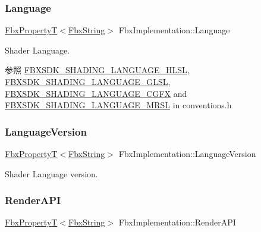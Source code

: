 \subsubsection{\texorpdfstring{Language}{Language}}
{\footnotesize\ttfamily \hyperlink{class_fbx_property_t}{Fbx\+PropertyT}$<$\hyperlink{class_fbx_string}{Fbx\+String}$>$ Fbx\+Implementation\+::\+Language}

Shader Language. \begin{DoxySeeAlso}{参照}
\hyperlink{fbxshadingconventions_8h_ac10b54a713e5562fe6572d1a2594288f}{F\+B\+X\+S\+D\+K\+\_\+\+S\+H\+A\+D\+I\+N\+G\+\_\+\+L\+A\+N\+G\+U\+A\+G\+E\+\_\+\+H\+L\+SL}, \hyperlink{fbxshadingconventions_8h_a52222f21db3187bf9ed4986f053aa44f}{F\+B\+X\+S\+D\+K\+\_\+\+S\+H\+A\+D\+I\+N\+G\+\_\+\+L\+A\+N\+G\+U\+A\+G\+E\+\_\+\+G\+L\+SL}, \hyperlink{fbxshadingconventions_8h_a0551f4268e3fc2e0fcd9464297b31b6f}{F\+B\+X\+S\+D\+K\+\_\+\+S\+H\+A\+D\+I\+N\+G\+\_\+\+L\+A\+N\+G\+U\+A\+G\+E\+\_\+\+C\+G\+FX} and \hyperlink{fbxshadingconventions_8h_a7941affa96f6fc8d3345dac506c71ea2}{F\+B\+X\+S\+D\+K\+\_\+\+S\+H\+A\+D\+I\+N\+G\+\_\+\+L\+A\+N\+G\+U\+A\+G\+E\+\_\+\+M\+R\+SL} in conventions.\+h 
\end{DoxySeeAlso}
\mbox{\label{class_fbx_implementation_aebb544e23225701b6e92cd058bc09bab}} 
\subsubsection{\texorpdfstring{Language\+Version}{LanguageVersion}}
{\footnotesize\ttfamily \hyperlink{class_fbx_property_t}{Fbx\+PropertyT}$<$\hyperlink{class_fbx_string}{Fbx\+String}$>$ Fbx\+Implementation\+::\+Language\+Version}



Shader Language version. 

\mbox{\label{class_fbx_implementation_ac127174c10e30bdf28d2e276c7818302}} 
\subsubsection{\texorpdfstring{Render\+A\+PI}{RenderAPI}}
{\footnotesize\ttfamily \hyperlink{class_fbx_property_t}{Fbx\+PropertyT}$<$\hyperlink{class_fbx_string}{Fbx\+String}$>$ Fbx\+Implementation\+::\+Render\+A\+PI}

